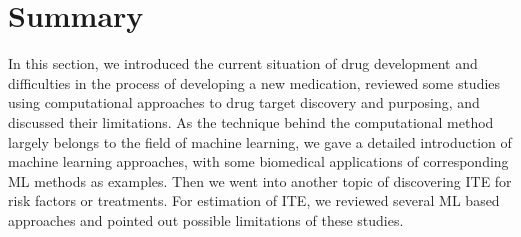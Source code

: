   \section{Summary}
    In this section, we introduced the current situation of drug development and difficulties in the process of developing a new medication, reviewed some studies using computational approaches to drug target discovery and purposing, and discussed their limitations. As the technique behind the computational method largely belongs to the field of machine learning, we gave a detailed introduction of machine learning approaches, with some biomedical applications of corresponding ML methods as examples. Then we went into another topic of discovering ITE for risk factors or treatments. For estimation of ITE, we reviewed several ML based approaches and pointed out possible limitations of these studies.
     
\chapterend